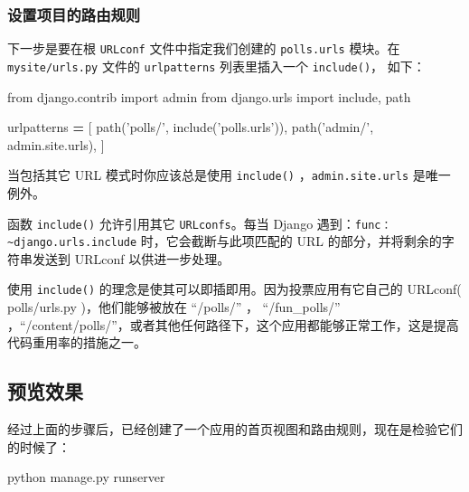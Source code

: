 \documentclass[]{ctexbook}
\newenvironment{Shaded}{\begin{snugshade}}{\end{snugshade}}
\newcommand{\ExtensionTok}[1]{#1}
\newcommand{\ImportTok}[1]{#1}
\newcommand{\NormalTok}[1]{#1}
\newcommand{\OperatorTok}[1]{\textcolor[rgb]{0.81,0.36,0.00}{\textbf{#1}}}
\newcommand{\StringTok}[1]{\textcolor[rgb]{0.31,0.60,0.02}{#1}}
\begin{document}
\hypertarget{ux8bbeux7f6eux9879ux76eeux7684ux8defux7531ux89c4ux5219}{%
\subsubsection{设置项目的路由规则}\label{ux8bbeux7f6eux9879ux76eeux7684ux8defux7531ux89c4ux5219}}

下一步是要在根 \texttt{URLconf} 文件中指定我们创建的 \texttt{polls.urls} 模块。在 \texttt{mysite/urls.py} 文件的 \texttt{urlpatterns} 列表里插入一个 \texttt{include()}， 如下：

\begin{Shaded}
\begin{Highlighting}[]
\ImportTok{from}\NormalTok{ django.contrib }\ImportTok{import}\NormalTok{ admin}
\ImportTok{from}\NormalTok{ django.urls }\ImportTok{import}\NormalTok{ include, path}

\NormalTok{urlpatterns }\OperatorTok{=}\NormalTok{ [}
\NormalTok{    path(}\StringTok{'polls/'}\NormalTok{, include(}\StringTok{'polls.urls'}\NormalTok{)),}
\NormalTok{    path(}\StringTok{'admin/'}\NormalTok{, admin.site.urls),}
\NormalTok{]}
\end{Highlighting}
\end{Shaded}

当包括其它 URL 模式时你应该总是使用 \texttt{include()} ，\texttt{admin.site.urls} 是唯一例外。

函数 \texttt{include()} 允许引用其它 \texttt{URLconfs}。每当 Django 遇到：\texttt{func：\textasciitilde{}django.urls.include} 时，它会截断与此项匹配的 URL 的部分，并将剩余的字符串发送到 URLconf 以供进一步处理。

使用 \texttt{include()} 的理念是使其可以即插即用。因为投票应用有它自己的 URLconf( polls/urls.py )，他们能够被放在 ``/polls/'' ， ``/fun\_polls/'' ，``/content/polls/''，或者其他任何路径下，这个应用都能够正常工作，这是提高代码重用率的措施之一。

\hypertarget{ux9884ux89c8ux6548ux679c}{%
\subsection{预览效果}\label{ux9884ux89c8ux6548ux679c}}

经过上面的步骤后，已经创建了一个应用的首页视图和路由规则，现在是检验它们的时候了：

\begin{Shaded}
\begin{Highlighting}[]
\ExtensionTok{python}\NormalTok{ manage.py runserver}
\end{Highlighting}
\end{Shaded}
\end{document}
